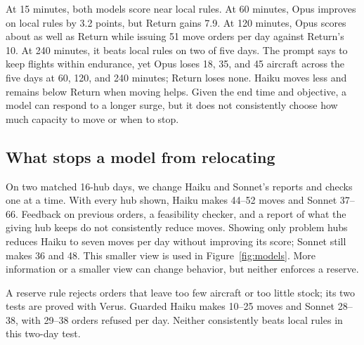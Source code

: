 \documentclass[letterpaper,10pt,conference]{ieeeconf}
\begin{document}
\begin{center}
\begin{minipage}{\columnwidth}
\centering
\resizebox{\columnwidth}{!}{}
\label{fig:surge-informed}
\end{minipage}
\end{center}

At 15 minutes, both models score near local rules. At 60 minutes, Opus
improves on local rules by 3.2 points, but Return gains 7.9. At 120
minutes, Opus scores about as well as Return while issuing 51 move orders
per day against Return's 10. At 240 minutes, it beats local rules on two
of five days. The prompt says to keep flights within endurance, yet Opus
loses 18, 35, and 45 aircraft across the five days at 60, 120, and 240
minutes; Return loses none. Haiku moves less and remains below Return
when moving helps. Given the end time and objective, a model can respond
to a longer surge, but it does not consistently choose how much capacity
to move or when to stop.

\subsection{What stops a model from relocating}
\label{sec:holds}

On two matched 16-hub days, we change Haiku and Sonnet's reports and
checks one at a time. With every hub shown, Haiku makes 44--52 moves and
Sonnet 37--66. Feedback on previous orders, a feasibility checker, and a
report of what the giving hub keeps do not consistently reduce moves.
Showing only problem hubs reduces Haiku to seven moves per day without
improving its score; Sonnet still makes 36 and 48. This smaller view is
used in Figure~\ref{fig:models}. More information or a smaller view can
change behavior, but neither enforces a reserve.

A reserve rule rejects orders that leave too few aircraft or too little
stock; its two tests are proved with Verus. Guarded Haiku makes 10--25
moves and Sonnet 28--38, with 29--38 orders refused per day. Neither
consistently beats local rules in this two-day test.
\end{document}

